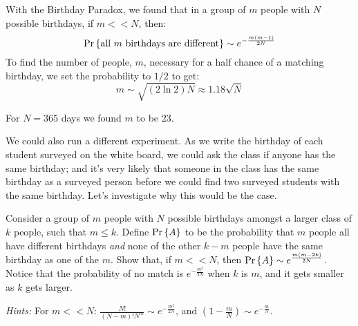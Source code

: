 \documentclass[twoside,12pt]{article}
\begin{document}
\begin{problem}{15}
With the Birthday Paradox, we found that in a group of $m$ people with $N$ possible birthdays, if $m << N$, then:
\[
\mathop{\textup{Pr}}\nolimits\left\{\text{all $m$ birthdays are different}\right\} \sim e^{-\frac{m(m-1)}{2N}}
\]
To find the number of people, $m$, necessary for a half chance of a matching birthday, we set the probability to $1/2$ to get:
\[
m \sim \sqrt{(2\ln2)N} \approx 1.18\sqrt{N}
\]

For $N = 365$ days we found $m$ to be 23.

We could also run a different experiment. As we write the birthday of each student surveyed on the white board, we could ask the class if anyone has the same birthday; and it's very likely that someone in the class has the same birthday as a surveyed person before we could find two surveyed students with the same birthday. Let's investigate why this would be the case.

\bparts
{} Consider a group of $m$ people with $N$ possible birthdays amongst a larger class of $k$ people, such that $m \leq k$. Define $\mathop{\textup{Pr}}\nolimits\left\{A\right\}$ to be the probability that $m$ people all have different birthdays \textit{and} none of the other $k-m$ people have the same birthday as one of the $m$. Show that, if $m << N$, then $\mathop{\textup{Pr}}\nolimits\left\{A\right\} \sim e^{\frac{m(m-2k)}{2N}}$. Notice that the probability of no match is $e^{-\frac{m^2}{2N}}$ when $k$ is $m$, and it gets smaller as $k$ gets larger. 

\textit{Hints:} For $m << N$: $\frac{N!}{(N-m)!N^m} \sim e^{-\frac{m^2}{2N}}$, and $(1-\frac{m}{N}) \sim e^{-\frac{m}{N}}$.

\end{problem}
\end{document}
